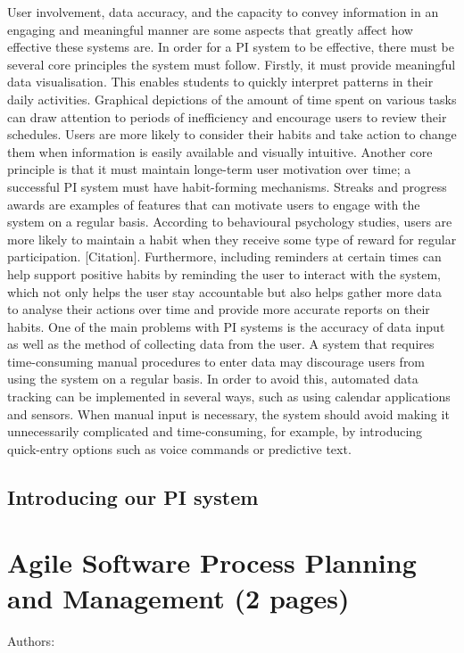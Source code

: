 \documentclass[12pt,a4paper]{article}
\begin{document}
User involvement, data accuracy, and the capacity to convey information in an engaging and meaningful manner are some aspects that greatly affect how effective these systems are. In order for a PI system to be effective, there must be several core principles the system must follow. Firstly, it must provide meaningful data visualisation. This enables students to quickly interpret patterns in their daily activities. Graphical depictions of the amount of time spent on various tasks can draw attention to periods of inefficiency and encourage users to review their schedules. Users are more likely to consider their habits and take action to change them when information is easily available and visually intuitive. Another core principle is that it must maintain longe-term user motivation over time; a successful PI system must have habit-forming mechanisms. Streaks and progress awards are examples of features that can motivate users to engage with the system on a regular basis. According to behavioural psychology studies, users are more likely to maintain a habit when they receive some type of reward for regular participation. [Citation]. Furthermore, including reminders at certain times can help support positive habits by reminding the user to interact with the system, which not only helps the user stay accountable but also helps gather more data to analyse their actions over time and provide more accurate reports on their habits. One of the main problems with PI systems is the accuracy of data input as well as the method of collecting data from the user. A system that requires time-consuming manual procedures to enter data may discourage users from using the system on a regular basis.  In order to avoid this, automated data tracking can be implemented in several ways, such as using calendar applications and sensors. When manual input is necessary, the system should avoid making it unnecessarily complicated and time-consuming, for example, by introducing quick-entry options such as voice commands or predictive text.

\subsection{Introducing our PI system}

\label{sec:intro}


\section{Agile Software Process Planning and Management (2 pages)}
Authors:
\label{sec:agile}
\end{document}
